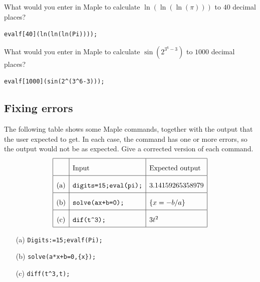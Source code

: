 \documentclass[a4paper]{article}
\begin{document}
\begin{problem}\label{ex-evalf-iii}
 What would you enter in Maple to calculate $\ln(\ln(\ln(\pi)))$
 to $40$ decimal places? 
\end{problem}
\begin{solution}
 \verb~evalf[40](ln(ln(ln(Pi))));~ 
\end{solution}

\begin{problem}\label{ex-evalf-ii}
 What would you enter in Maple to calculate $\sin(2^{3^6-3})$
 to $1000$ decimal places?  
\end{problem}
\begin{solution}
 \verb~evalf[1000](sin(2^(3^6-3)));~ \hspace{2em}
\end{solution}



\subsection{Fixing errors}

\begin{problem}
 The following table shows some Maple commands, together
 with the output that the user expected to get.  In each
 case, the command has one or more errors, so the output
 would not be as expected.  Give a corrected version of each
 command.   
 \[ \renewcommand{\arraystretch}{2}
    \begin{array}{|c|l|l|}
     \hline
      & \text{Input} & \text{Expected output} \\ \hline
      \text{(a)} &
      \verb~digits=15;eval(pi);~ &
      3.14159265358979 \\ \hline
      \text{(b)} &
      \verb~solve(ax+b=0);~ &
      \{x=-b/a\} \\ \hline
      \text{(c)} &
      \verb~dif(t^3);~ &
      3t^2 \\ \hline
    \end{array}
 \]
\end{problem}
\begin{solution}
 \begin{itemize}
  \item[(a)] \verb~Digits:=15;evalf(Pi);~      \hspace{2em}
  \item[(b)] \verb~solve(a*x+b=0,{x});~        \hspace{2em}
  \item[(c)] \verb~diff(t^3,t);~                \hspace{2em}
 \end{itemize}
\end{solution}
\end{document}

